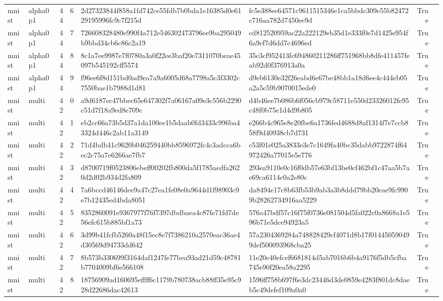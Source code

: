 \begin{tabular}{llrrllrl}
mnist & alpha0p1 & 44 & 6 & 2d27323844f858a1fd742ce55fdb7b0bda1e16385d0e6129195996fc9c7f215d & fc5e388ee64571c9611515346e1ca5bbdc309e55b82472c716aa782d7450ee9d & True &  \\
mnist & alpha0p1 & 44 & 7 & 726608328480e990f4a712e546302473796ee9ba295049b9bbd34cb6c86c2a19 & cd812520959ac22a222129eb35d1e333f0e7d1425e954f6a9cf7d6dd7c4696ed & True &  \\
mnist & alpha0p1 & 44 & 8 & 8c1a7ee9987e7f0780a3a0f22ee3baf20e7311070beae45097b545192cff5574 & 35c3cf952413fc694860211286ff751968bb8dfe411457feab92d0f376913a0a & True &  \\
mnist & alpha0p1 & 44 & 9 & f96ee6f8d151bd0ad9ea7a9a6005d68a7798a5c3f3302c7550bae1b7988d1d81 & d9eb6130e32f26eabd6e67be48bb1a18d6ee4c444eb05a2a5c59b9070015ede0 & True &  \\
mnist & multi & 42 & 0 & a9d6187ec47bbec65e647302f7a06167a09e3c556b2290c51d7f18a9ed8e709c & d4b46ee7b086b6f056cb979c58711e550d23326012fe95c48f0b75e1d4d9b805 & True &  \\
mnist & multi & 42 & 1 & eb2cc66a73b5d37a1da100ee1b5daab0fd3433c996ba43324d446c2ab11a3149 & e266b4c965e8e20fbe6a1736fed4688d8af1314f7e7ccb858f9d40938cb7d731 & True &  \\
mnist & multi & 42 & 2 & 71d4bdb41c9620b046259440bb8596972fc4c3adcca6bec2c75a7e6266ae7fb7 & c53f01e025a3833e3e7c1649fa40bc35dabb9722874f64972426a77015e5e776 & True &  \\
mnist & multi & 42 & 3 & d8700719f0523806ebeff00202fb800da5f1785aedfa2620d2d02b934d2fa809 & 293ea9110e0c16f0db57e63bf13be0cf462bf1c47aa5b7ae69ca6114c0a2e80c & True &  \\
mnist & multi & 42 & 4 & 7a6bccd46146dee9a47c27ea1fe08e0a9644d1f98903c9e7b12435ed4bda8051 & da8494e17c8b63fb53b9ab3a3b8ddd79bb20eae9fc9909b28262734916aa5229 & True &  \\
mnist & multi & 42 & 5 & 8352860091e9367977f76f7397dbdbaea4c87fe71fd7de56efc615b885bf1a73 & 576a47bdf57c16f75f0736e081504d5fa022c0a8668a1e596b71e5dce94923a5 & True &  \\
mnist & multi & 42 & 6 & 3d99b41fcfb5260a48f15ec8e7f7386210a2570eac36ae4d30569d94733dd642 & 57a2304369284a748828429cf4071d8b17f014450590499def500093968cba25 & True &  \\
mnist & multi & 42 & 7 & 8b573b330699f3164daf1247fe77bea93ad21d59c48781b7704009bf6e566108 & 11e20e40efcef6681814d5ab7016b6b4a9176f5db5cfba745e90f20ea58a2295 & True &  \\
mnist & multi & 42 & 8 & 18756909ad160695effff6c1179b780738acb88ff35e95c928d22686dac42613 & 1596ff758b697f6e3dc23446d3de0859e4283f801dc8daeb5c49defef109a0a0 & True &  \\

\end{tabular}
